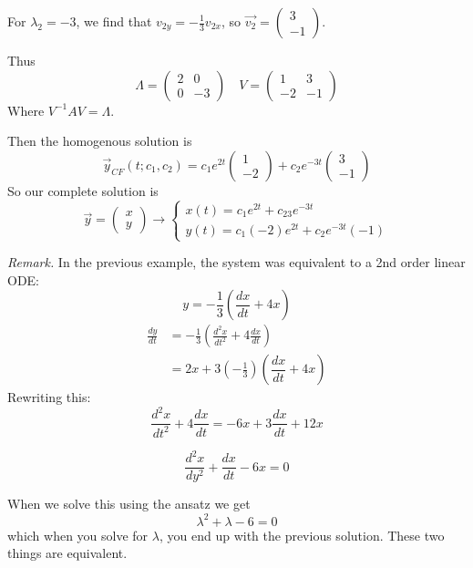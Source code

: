 \documentclass[10pt]{scrartcl}
\begin{document}
\begin{example}
 For $\lambda_2 = -3$, we find that $v_{2y} = -\frac{1}{3}v_{2x}$, so $
  \vec{v_2} = \begin{pmatrix}
 3 \\ -1	
 \end{pmatrix}$.

Thus
\[
  \Lambda = \begin{pmatrix}
 2 & 0 \\ 0& -3	
 \end{pmatrix}\quad 
 V = \begin{pmatrix}
 1 & 3 \\ -2 & -1	
 \end{pmatrix}
\]
Where $V^{-1}AV = \Lambda$. 

Then the homogenous solution is 
\[
  \vec{y}_{CF}(t;c_1,c_2) = c_1e^{2t}\begin{pmatrix}
1 \\ -2	
\end{pmatrix}
+ c_2 e^{-3t}\begin{pmatrix}
3 \\ -1	
\end{pmatrix}
\]
So our complete solution is 
\[
  \vec{y} = \begin{pmatrix}
 x \\ y	
 \end{pmatrix}
 \longrightarrow
 \begin{cases}
 x(t) = c_1e^{2t} + c_23e^{-3t}\\
 y(t) = c_1(-2)e^{2t} + c_2e^{-3t}(-1)	
 \end{cases}
\]
\end{example}


\emph{Remark.} In the previous example, the system was equivalent to a 2nd order linear ODE:
\[
  y = -\frac{1}{3}\left(\frac{dx}{dt} + 4x\right)
\]
\begin{align*}
  \frac{dy}{dt} &= -\frac{1}{3}\left(\frac{d^2x}{dt^2} + 4\frac{dx}{dt}\right)\\[.2cm]
  &= 2x + 3 (-\textstyle{\frac{1}{3}})\left(\dfrac{dx}{dt} + 4x\right)
\end{align*}
Rewriting this:
\[
  \frac{d^2x}{dt^2} + 4\frac{dx}{dt} = -6x + 3\frac{dx}{dt} + 12x
\]

\[
  \frac{d^2x}{dy^2} + \frac{dx}{dt} - 6x = 0
\]

When we solve this using the ansatz we get
\[
  \lambda^2 + \lambda - 6 = 0
\]
which when you solve for $\lambda$, you end up with the previous solution. These two things are equivalent. 
\end{document}
